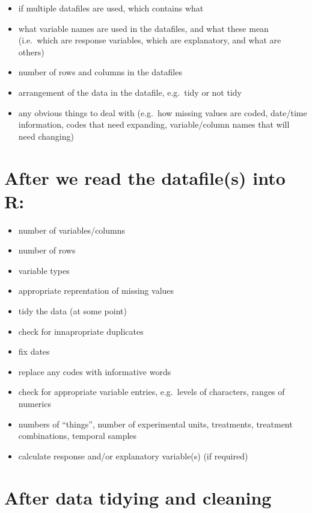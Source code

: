 \documentclass[]{book}
\providecommand{\tightlist}{%
  \setlength{\itemsep}{0pt}\setlength{\parskip}{0pt}}
\begin{document}
\begin{itemize}
\tightlist
\item
  if multiple datafiles are used, which contains what
\item
  what variable names are used in the datafiles, and what these mean (i.e.~which are response variables, which are explanatory, and what are others)
\item
  number of rows and columns in the datafiles
\item
  arrangement of the data in the datafile, e.g.~tidy or not tidy
\item
  any obvious things to deal with (e.g.~how missing values are coded, date/time information, codes that need expanding, variable/column names that will need changing)
\end{itemize}

\hypertarget{after-we-read-the-datafiles-into-r}{%
\chapter{After we read the datafile(s) into R:}\label{after-we-read-the-datafiles-into-r}}

\begin{itemize}
\tightlist
\item
  number of variables/columns
\item
  number of rows
\item
  variable types
\item
  appropriate reprentation of missing values
\item
  tidy the data (at some point)
\item
  check for innapropriate duplicates
\item
  fix dates
\item
  replace any codes with informative words
\item
  check for appropriate variable entries, e.g.~levels of characters, ranges of numerics
\item
  numbers of ``things'', number of experimental units, treatments, treatment combinations, temporal samples
\item
  calculate response and/or explanatory variable(s) (if required)
\end{itemize}

\hypertarget{after-data-tidying-and-cleaning}{%
\chapter{After data tidying and cleaning}\label{after-data-tidying-and-cleaning}}
\end{document}
